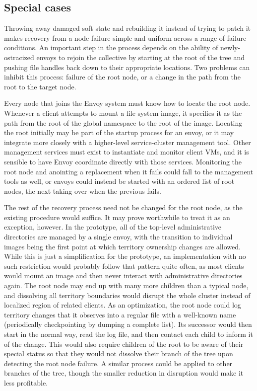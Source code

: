 \subsection{Special cases}

Throwing away damaged soft state and rebuilding it instead of trying to patch it makes recovery from a node failure simple and uniform across a range of failure conditions. An important step in the process depends on the ability of newly-ostracized envoys to rejoin the collective by starting at the root of the tree and pushing file handles back down to their appropriate locations. Two problems can inhibit this process: failure of the root node, or a change in the path from the root to the target node.

Every node that joins the Envoy system must know how to locate the root node. Whenever a client attempts to mount a file system image, it specifies it as the path from the root of the global namespace to the root of the image. Locating the root initially may be part of the startup process for an envoy, or it may integrate more closely with a higher-level service-cluster management tool. Other management services must exist to instantiate and monitor client VMs, and it is sensible to have Envoy coordinate directly with those services. Monitoring the root node and anointing a replacement when it fails could fall to the management tools as well, or envoys could instead be started with an ordered list of root nodes, the next taking over when the previous fails.

The rest of the recovery process need not be changed for the root node, as the existing procedure would suffice. It may prove worthwhile to treat it as an exception, however. In the prototype, all of the top-level administrative directories are managed by a single envoy, with the transition to individual images being the first point at which territory ownership changes are allowed. While this is just a simplification for the prototype, an implementation with no such restriction would probably follow that pattern quite often, as most clients would mount an image and then never interact with administrative directories again. The root node may end up with many more children than a typical node, and dissolving all territory boundaries would disrupt the whole cluster instead of localized region of related clients. As an optimization, the root node could log territory changes that it observes into a regular file with a well-known name (periodically checkpointing by dumping a complete list). Its successor would then start in the normal way, read the log file, and then contact each child to inform it of the change. This would also require children of the root to be aware of their special status so that they would not dissolve their branch of the tree upon detecting the root node failure. A similar process could be applied to other branches of the tree, though the smaller reduction in disruption would make it less profitable.

